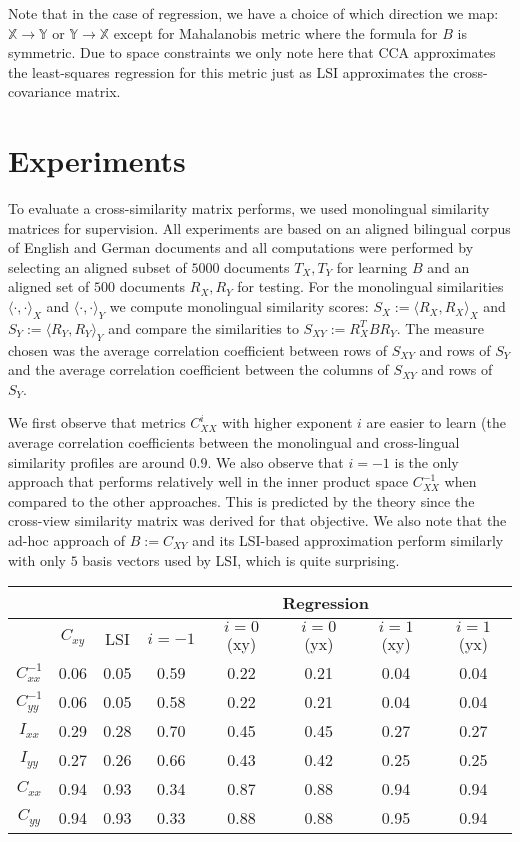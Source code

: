 \documentclass{article} %
\newcommand{\X}{\mathbb{X}}
\newcommand{\Y}{\mathbb{Y}}
\begin{document}
Note that in the case of regression, we have a choice of which
direction we map: $\X\rightarrow\Y$ or $\Y\rightarrow\X$ except
for Mahalanobis metric where the formula for $B$ is
symmetric. Due to space constraints we only note here that CCA approximates the least-squares
regression for this metric just as LSI approximates the
cross-covariance matrix.

\section{Experiments}
To evaluate a cross-similarity matrix performs, we used
monolingual similarity matrices for supervision. All experiments
are based on an aligned bilingual corpus of English and German
documents and all computations were performed by selecting an
aligned subset of $5000$ documents $T_X, T_Y$ for learning $B$
and an aligned set of $500$ documents $R_X, R_Y$
for testing. For the monolingual similarities $\langle \cdot, \cdot
\rangle_X$ and $\langle \cdot, \cdot \rangle_Y$ we compute
monolingual similarity scores: $S_X := \langle R_X, R_X
\rangle_X$ and $S_Y:= \langle R_Y, R_Y \rangle_Y$ and compare the
similarities to $S_{XY} := R_X^T B R_Y$. The measure chosen was
the average correlation coefficient between rows of $S_{XY}$ and
rows of $S_Y$ and the average correlation coefficient between the
columns of $S_{XY}$ and rows of $S_Y$.

We first observe that metrics $C_{X X}^i$ with higher exponent
$i$ are easier to learn (the average correlation coefficients
between the monolingual and cross-lingual similarity profiles are
around $0.9$. We also observe that $i=-1$ is the only approach
that performs relatively well in the inner product space
$C_{XX}^{-1}$ when compared to the other approaches. This is
predicted by the theory since the cross-view similarity matrix
was derived for that objective. We also note that the ad-hoc
approach of $B:= C_{XY}$ and its LSI-based approximation perform
similarly with only $5$ basis vectors used by LSI, which is quite
surprising.


\begin{center}
\begin{tabular}{|c|c|c|c|c|c|c|c|}
\hline
&\multicolumn{2}{|c|}{}&\multicolumn{5}{|c|}{Regression} \\
\hline
&       $C_{xy}$	&LSI & 	$i=-1$& $i=0$(xy)& $i=0$(yx) & $i=1$(xy) & $i=1$(yx)\\
\hline
$C_{xx}^{-1}$ &	0.06&	0.05&	0.59&	0.22&	0.21&	0.04&	0.04\\
\hline
$C_{yy}^{-1}$ &	0.06&	0.05&	0.58&	0.22&	0.21&	0.04&	0.04\\\hline
$I_{xx}$     &	0.29&	0.28&	0.70&	0.45&	0.45&	0.27&	0.27\\\hline
$I_{yy}$     &   0.27&	0.26&	0.66&	0.43&	0.42&	0.25&	0.25\\\hline
$C_{xx}$     &	0.94&	0.93&	0.34&	0.87&	0.88&	0.94&	0.94\\\hline
$C_{yy}$     &	0.94&	0.93&	0.33	&0.88&	0.88&	0.95&	0.94\\\hline
\end{tabular}
\end{center}

 
\end{document}
